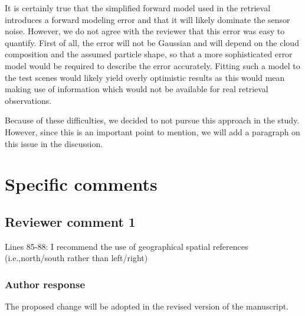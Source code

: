 \documentclass[11pt]{scrartcl}
\providecommand{\DIFadd}[1]{{\protect\textcolor{blue}{\uwave{#1}}}} %
\providecommand{\DIFdel}[1]{{\protect\textcolor{red}{\sout{#1}}}}                      %
\providecommand{\DIFaddbegin}{} %
\providecommand{\DIFaddend}{} %
\providecommand{\DIFdelbegin}{} %
\providecommand{\DIFdelend}{} %
\newenvironment{change}[1][]{%
  \begin{mdframed}[frametitle={Line #1:}]%
}{%
  \end{mdframed}%
}
\begin{document}
It is certainly true that the simplified forward model used in the retrieval
introduces a forward modeling error and that it will likely dominate the sensor
noise. However, we do not agree with the reviewer that this error was easy to
quantify. First of all, the error will not be Gaussian and will depend on the
cloud composition and the assumed particle shape, so that a more sophisticated
error model would be required to describe the error accurately. Fitting such a
model to the test scenes would likely yield overly optimistic results as this
would mean making use of information which would not be available
for real retrieval observations.

Because of these difficulties, we decided to not pursue this approach in the
study. However, since this is an important point to mention, we will add a
paragraph on this issue in the discussion.

%


\section{Specific comments}

\subsection*{Reviewer comment 1}
Lines 85-88: I recommend the use of geographical spatial references
(i.e.,north/south rather than left/right)

\subsubsection*{Author response}

The proposed change will be adopted in the revised version of the manuscript.

%
\end{document}
